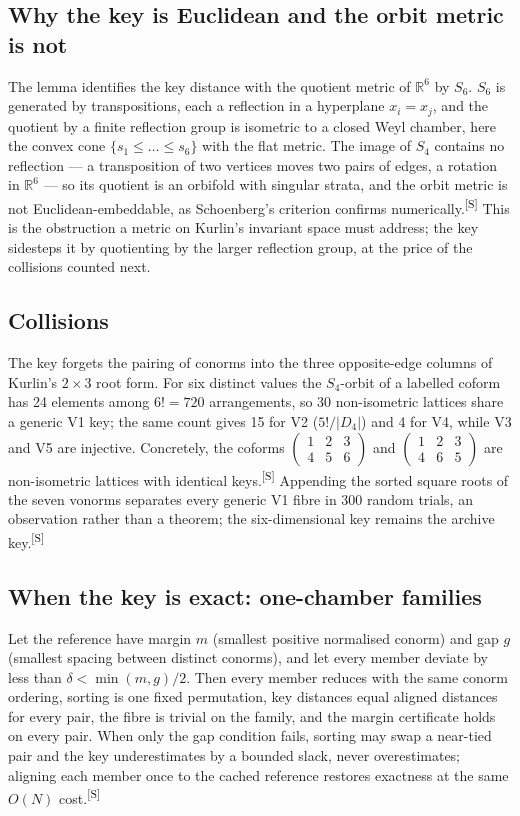 \documentclass[preprint,pdf]{iucr}          %
\makeatletter
\newcommand{\chk}[1]{\textsuperscript{[S\@nameuse{zn@#1}]}}
\makeatother
\begin{document}
\subsection{Why the key is Euclidean and the orbit metric is not}
The lemma identifies the key distance with the quotient metric of $\mathbb R^6$ by $S_6$. $S_6$ is generated by transpositions, each a reflection in a hyperplane $x_i=x_j$, and the quotient by a finite reflection group is isometric to a closed Weyl chamber, here the convex cone $\{s_1\le\dots\le s_6\}$ with the flat metric. The image of $S_4$ contains no reflection --- a transposition of two vertices moves two pairs of edges, a rotation in $\mathbb R^6$ --- so its quotient is an orbifold with singular strata, and the orbit metric is not Euclidean-embeddable, as Schoenberg's criterion confirms numerically.\chk{z:euclid} This is the obstruction a metric on Kurlin's invariant space must address; the key sidesteps it by quotienting by the larger reflection group, at the price of the collisions counted next.

\subsection{Collisions}
The key forgets the pairing of conorms into the three opposite-edge columns of Kurlin's $2\times3$ root form. For six distinct values the $S_4$-orbit of a labelled coform has 24 elements among $6!=720$ arrangements, so 30 non-isometric lattices share a generic V1 key; the same count gives 15 for V2 ($5!/|D_4|$) and 4 for V4, while V3 and V5 are injective. Concretely, the coforms $\begin{pmatrix}1&2&3\\4&5&6\end{pmatrix}$ and $\begin{pmatrix}1&2&3\\4&6&5\end{pmatrix}$ are non-isometric lattices with identical keys.\chk{z:fibre} Appending the sorted square roots of the seven vonorms separates every generic V1 fibre in 300 random trials, an observation rather than a theorem; the six-dimensional key remains the archive key.\chk{z:d7}

\subsection{When the key is exact: one-chamber families}
Let the reference have margin $m$ (smallest positive normalised conorm) and gap $g$ (smallest spacing between distinct conorms), and let every member deviate by less than $\delta<\min(m,g)/2$. Then every member reduces with the same conorm ordering, sorting is one fixed permutation, key distances equal aligned distances for every pair, the fibre is trivial on the family, and the margin certificate holds on every pair. When only the gap condition fails, sorting may swap a near-tied pair and the key underestimates by a bounded slack, never overestimates; aligning each member once to the cached reference restores exactness at the same $O(N)$ cost.\chk{z:isometry}
\end{document}
